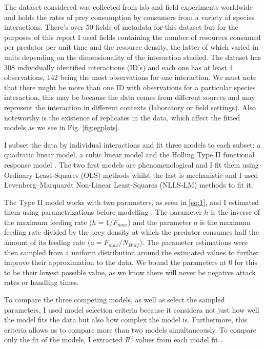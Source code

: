 \documentclass[11pt]{article}
\begin{document}
    The dataset considered was collected from lab and field experiments worldwide and holds the rates of prey consumption by consumers from a variety of species interactions. There's over 50 fields of metadata for this dataset but for the purposes of this report I used fields containing the number of resources consumed per predator per unit time and the resource density, the latter of which varied in units depending on the dimensionality of the interaction studied. The dataset has 308 individually identified interactions (ID’s) and each one has at least 4 observations, 142 being the most observations for one interaction. We must note that there might be more than one ID with observations for a particular species interaction, this may be because the data comes from different sources and may represent the interaction in different contexts (laboratory or field settings). Also noteworthy is the existence of replicates in the data, which affect the fitted models as we see in Fig. \ref{fig:egplots}.
    
    I subset the data by individual interactions and fit three models to each subset: a quadratic linear model, a cubic linear model and the Holling Type II functional response model \cite{Holling1959}. The two first models are phenomenological and I fit them using Ordinary Least-Squares (OLS) methods whilst the last is mechanistic and I used Levenberg–Marquardt Non-Linear Least-Squares (NLLS-LM) methods to fit it.  
    
    The Type II model works with two parameters, as seen in \eqref{eq:1}, and I estimated them using parametrizations before modelling \cite{Real1977, Rosenbaum2018}. The parameter $h$ is the inverse of the maximum feeding rate ($h=1/F_{max}$) and the parameter $a$ is the maximum feeding rate divided by the prey density at which the predator consumes half the amount of its feeding rate ($a=F_{max}/N_{Half}$). The parameter estimations were then sampled from a uniform distribution around the estimated values to further improve their approximation to the data. We bound the parameters at 0 for this to be their lowest possible value, as we know there will never be negative attack rates or handling times.
    
    To compare the three competing models, as well as select the sampled parameters, I used model selection criteria because it considera not just how well the model fits the data but also how complex the model is. Furthermore, this criteria allows us to compare more than two models simultaneously. To compare only the fit of the models, I extracted $R^2$ values from each model fit \cite{JohnsonOmland2004}.
    
\end{document}

